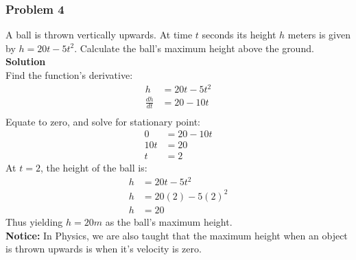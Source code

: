 \documentclass[hidelinks, a4paper, 12pt]{article}
\newcommand{\bd}{\textbf}
\newcommand{\n}{\\[\baselineskip]}
\begin{document}
            \subsubsection{Problem 4}
                A ball is thrown vertically upwards. At time $t$ seconds its height $h$ meters is given by $h = 20t-5t^2$. 
                Calculate the ball's maximum height above the ground.\n
                \bd{Solution}\n
                Find the function's derivative:
                \[\begin{split}
                    h &= 20t - 5t^2\\
                    \frac{dh}{dt} &= 20 - 10t\\
                \end{split}\]
                Equate to zero, and solve for stationary point:
                \[\begin{split}
                    0 &= 20 - 10t\\
                    10t &= 20\\
                    t &= 2
                \end{split}\]
                At $t = 2$, the height of the ball is:
                \[\begin{split}
                    h &= 20t - 5t^2\\
                    h &= 20(2) - 5(2)^2\\
                    h &= 20
                \end{split}\]
                Thus yielding $h = 20m$ as the ball's maximum height.\n
                \bd{Notice:} In Physics, we are also taught that the maximum height when an object is thrown upwards is when it's velocity is zero.
                
\end{document}
